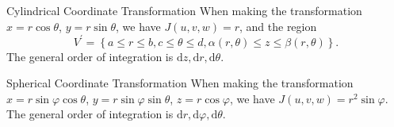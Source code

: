 \begin{proposition}{Cylindrical Coordinate Transformation}{}
  When making the transformation $x = r\cos \theta$, $y = r\sin \theta$,
  we have $J(u,v,w) = r$, and the region
  \begin{equation}
    V^{\prime} = \left\{ a \leq r \leq b, c \leq \theta \leq d, \alpha(r,\theta) \leq z \leq \beta(r,\theta) \right\}.
  \end{equation}
  The general order of integration is $\mathrm{d}z, \mathrm{d} r, \mathrm{d} \theta$.
\end{proposition}


\begin{proposition}{Spherical Coordinate Transformation}{}
  When making the transformation $x = r\sin \varphi\cos \theta$,
  $y = r\sin \varphi\sin \theta$,
  $z = r \cos \varphi$,
  we have $J(u,v,w) = r^2 \sin \varphi$.
  The general order of integration is $\mathrm{d}r, \mathrm{d} \varphi, \mathrm{d} \theta$.
\end{proposition}







